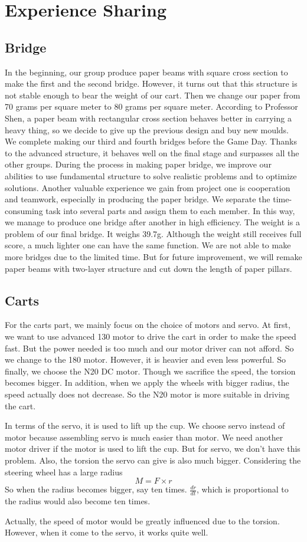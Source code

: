 \section{Experience Sharing}

\subsection{Bridge}
In the beginning, our group produce paper beams with square cross section to make the first and the second bridge. However, it turns out that this structure is not stable enough to bear the weight of our cart. Then we change our paper from 70 grams per square meter to 80 grams per square meter. According to Professor Shen, a paper beam with rectangular cross section behaves better in carrying a heavy thing, so we decide to give up the previous design and buy new moulds. We complete making our third and fourth bridges before the Game Day. Thanks to the advanced structure, it behaves well on the final stage and surpasses all the other groups.
During the process in making paper bridge, we improve our abilities to use fundamental structure to solve realistic problems and to optimize solutions. Another valuable experience we gain from project one is cooperation and teamwork, especially in producing the paper bridge. We separate the time-consuming task into several parts and assign them to each member. In this way, we manage to produce one bridge after another in high efficiency.
The weight is a problem of our final bridge. It weighs 39.7g. Although the weight still receives full score, a much lighter one can have the same function. We are not able to make more bridges due to the limited time. But for future improvement, we will remake paper beams with two-layer structure and cut down the length of paper pillars.

\subsection{Carts}
For the carts part, we mainly focus on the choice of motors and servo. At first, we want to use advanced 130 motor to drive the cart in order to make the speed fast. But the power needed is too much and our motor driver can not afford. So we change to the 180 motor. However, it is heavier and even less powerful. So finally, we choose the N20 DC motor. Though we sacrifice the speed, the torsion becomes bigger. In addition, when we apply the wheels with bigger radius, the speed actually does not decrease. So the N20 motor is more suitable in driving the cart.
\par
In terms of the servo, it is used to lift up the cup. We choose servo instead of motor because assembling servo is much easier than motor. We need another motor driver if the motor is used to lift the cup. But for servo, we don’t have this problem. Also, the torsion the servo can give is also much bigger. Considering the steering wheel has a large radius
$$M=F\times r$$
So when the radius becomes bigger, say ten times. $\frac{dr}{dt}$, which is proportional to the radius would also become ten times. 
\par
Actually, the speed of motor would be greatly influenced due to the torsion. However, when it come to the servo, it works quite well.
